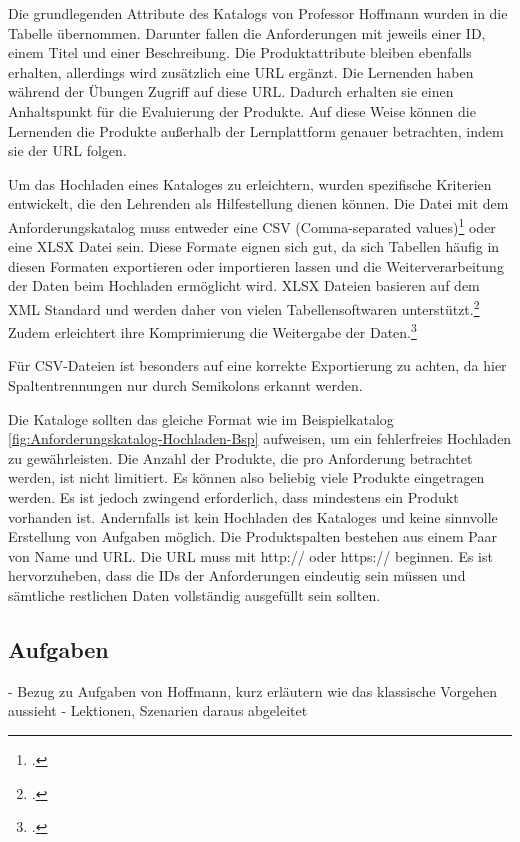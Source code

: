 Die grundlegenden Attribute des Katalogs von Professor Hoffmann wurden in die Tabelle übernommen. Darunter fallen die Anforderungen mit jeweils einer ID, einem Titel und einer Beschreibung. Die Produktattribute bleiben ebenfalls erhalten, allerdings wird zusätzlich eine URL ergänzt. Die Lernenden haben während der Übungen Zugriff auf diese URL. Dadurch erhalten sie einen Anhaltspunkt für die Evaluierung der Produkte. Auf diese Weise können die Lernenden die Produkte außerhalb der Lernplattform genauer betrachten, indem sie der URL folgen.

Um das Hochladen eines Kataloges zu erleichtern, wurden spezifische Kriterien entwickelt, die den Lehrenden als Hilfestellung dienen können. 
Die Datei mit dem Anforderungskatalog muss entweder eine CSV (Comma-separated values)\footcite[Vgl.][]{csv}{}{} oder eine XLSX Datei sein. Diese Formate eignen sich gut, da sich Tabellen häufig in diesen Formaten exportieren oder importieren lassen und die Weiterverarbeitung der Daten beim Hochladen ermöglicht wird. XLSX Dateien basieren auf dem XML Standard und werden daher von vielen Tabellensoftwaren unterstützt.\footcite[Vgl.][]{xlsx}{}{} Zudem erleichtert ihre Komprimierung die Weitergabe der Daten.\footcite[Vgl.][]{xlsx}{}{}

Für CSV-Dateien ist besonders auf eine korrekte Exportierung zu achten, da hier Spaltentrennungen nur durch Semikolons erkannt werden.

Die Kataloge sollten das gleiche Format wie im Beispielkatalog \ref{fig:Anforderungskatalog-Hochladen-Bsp} aufweisen, um ein fehlerfreies Hochladen zu gewährleisten.
Die Anzahl der Produkte, die pro Anforderung betrachtet werden, ist nicht limitiert. Es können also beliebig viele Produkte eingetragen werden. Es ist jedoch zwingend erforderlich, dass mindestens ein Produkt vorhanden ist. Andernfalls ist kein Hochladen des Kataloges und keine sinnvolle Erstellung von Aufgaben möglich.
Die Produktspalten bestehen aus einem Paar von Name und URL. Die URL muss mit \glqq http://\grqq{} oder \glqq https://\grqq{} beginnen. 
Es ist hervorzuheben, dass die IDs der Anforderungen eindeutig sein müssen und sämtliche restlichen Daten vollständig ausgefüllt sein sollten. 

\subsection{Aufgaben}
- Bezug zu Aufgaben von Hoffmann, kurz erläutern wie das klassische Vorgehen aussieht
- Lektionen, Szenarien daraus abgeleitet 

